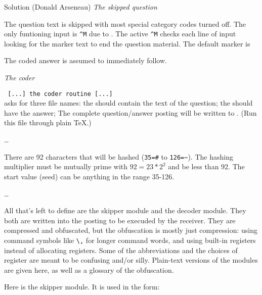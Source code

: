 \begin{solution}{Solution (Donald Arseneau)}
\noindent\textit{ The skipped question}


 The question text is skipped with most special category codes
 turned off.  The only funtioning input is \verb?^M? due to \cmd{\obeylines}.
 The active \verb?^M? checks each line of input looking for the marker
 text to end the question material.  The default marker is
\begin{lcode}
\end{lcode}
 The coded answer is assumed to immediately follow.


\noindent\textit{The coder}


 \verb? [...] the coder routine [...]? \\
 asks for three file names:  the \cmd{\QuestionFileName} should
 contain the text of the question;  the \cmd{\SolutionFileName} should
 have the answer;  The complete question/answer posting will be
 written to \cmd{\OutputFileName}.  (Run this file through plain TeX.)

\ldots

 There are 92 characters that will be hashed (\verb?35=#? to \verb?126=~?).
 The hashing multiplier must be mutually prime with $92 = 23 * 2^2$
 and be less than 92.  The start value (seed) can be anything
 in the range 35-126.

\ldots

 All that's left to define are the skipper module and the decoder
 module.  They both are written into the posting to be execuded
 by the receiver.  They are compressed and obfuscated, but the
 obfuscation is mostly just compression: using command symbols
 like \verb?\,? for longer command words, and using built-in registers
 instead of allocating registers.  Some of the abbreviations and
 the choices of register are meant to be confusing and/or silly.
 Plain-text versions of the modules are given here, as well as
 a glossary of the obfuscation.

 Here is the skipper module.  It is used in the form:
\begin{lcode}
\end{lcode}
\begin{lcode}
\def\Question:{\bgroup
  \aftergroup\end
  \allother
  \Skipper}
\end{lcode}


\end{solution}
